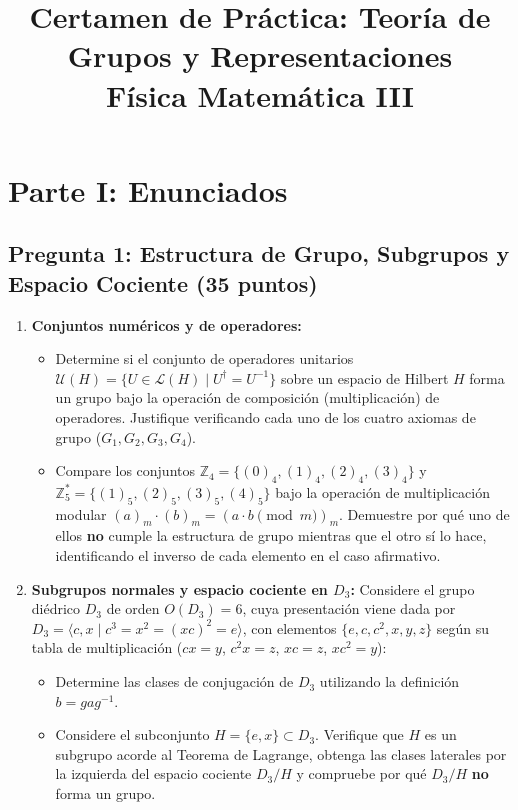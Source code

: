 \documentclass[11pt, a4paper]{article}
\title{\textbf{Certamen de Práctica: Teoría de Grupos y Representaciones}\\ \large Física Matemática III}
\author{}
\date{}
\begin{document}
\maketitle

\section*{Parte I: Enunciados}

\subsection*{Pregunta 1: Estructura de Grupo, Subgrupos y Espacio Cociente (35 puntos)}
\begin{enumerate}
    \item \textbf{Conjuntos numéricos y de operadores:}
    \begin{itemize}
        \item Determine si el conjunto de operadores unitarios $\mathcal{U}(H) = \{U \in \mathcal{L}(H) \mid U^\dagger = U^{-1}\}$ sobre un espacio de Hilbert $H$ forma un grupo bajo la operación de composición (multiplicación) de operadores. Justifique verificando cada uno de los cuatro axiomas de grupo ($G_1, G_2, G_3, G_4$).
        \item Compare los conjuntos $\mathbb{Z}_4 = \{(0)_4, (1)_4, (2)_4, (3)_4\}$ y $\mathbb{Z}_5^* = \{(1)_5, (2)_5, (3)_5, (4)_5\}$ bajo la operación de multiplicación modular $(a)_m \cdot (b)_m = (a \cdot b \pmod m)_m$. Demuestre por qué uno de ellos \textbf{no} cumple la estructura de grupo mientras que el otro sí lo hace, identificando el inverso de cada elemento en el caso afirmativo.
    \end{itemize}
    \item \textbf{Subgrupos normales y espacio cociente en $D_3$:}
    Considere el grupo diédrico $D_3$ de orden $O(D_3) = 6$, cuya presentación viene dada por $D_3 = \langle c, x \mid c^3 = x^2 = (xc)^2 = e \rangle$, con elementos $\{e, c, c^2, x, y, z\}$ según su tabla de multiplicación ($cx = y$, $c^2x = z$, $xc = z$, $xc^2 = y$):
    \begin{itemize}
        \item Determine las clases de conjugación de $D_3$ utilizando la definición $b = gag^{-1}$.
        \item Considere el subconjunto $H = \{e, x\} \subset D_3$. Verifique que $H$ es un subgrupo acorde al Teorema de Lagrange, obtenga las clases laterales por la izquierda del espacio cociente $D_3/H$ y compruebe por qué $D_3/H$ \textbf{no} forma un grupo.
    \end{itemize}
\end{enumerate}
\end{document}
